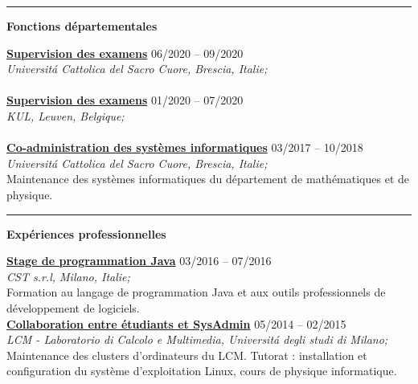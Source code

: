 \documentclass[a4paper]{article}
\newcommand{\block}[1]{\hrule \vspace{0.2cm} \textbf{\Large #1} \vspace{0.2cm}}
\newcommand{\voice}[5]{\href{#4}{\textbf{#1}} \hfill #2 \\ \textit{#3} \\ {\small #5} \vspace{0.2cm} \\}
\begin{document}
    \block{Fonctions départementales}

    
    \voice{Supervision des examens}
        {06/2020 -- 09/2020}
        {Universit\'a Cattolica del Sacro Cuore, Brescia, Italie;}
        {}       
        {\vspace{-0.5cm}}
    \voice{Supervision des examens}
        {01/2020 -- 07/2020}
        {KUL, Leuven, Belgique;}
        {}       
        {\vspace{-0.5cm}}
    \voice{Co-administration des systèmes informatiques}
        {03/2017 -- 10/2018}
        {Universit\'a Cattolica del Sacro Cuore, Brescia, Italie;}
        {https://dipartimenti.unicatt.it/dmf-home}       
        {Maintenance des systèmes informatiques du département de mathématiques et de physique.}

        




    \block{Expériences professionnelles}

    
    \voice{Stage de programmation Java}
        {03/2016  -- 07/2016}
        {CST s.r.l, Milano, Italie;}
        {https://www.csttech.it/}       
        {Formation au langage de programmation Java et aux outils professionnels de développement de logiciels.}
    \voice{Collaboration entre étudiants et SysAdmin}
        {05/2014 -- 02/2015}
        {LCM - Laboratorio di Calcolo e Multimedia, Universit\'a degli studi di Milano;}
        {https://lcm.mi.infn.it/}       
        {Maintenance des clusters d'ordinateurs du LCM. Tutorat : installation et configuration du système d'exploitation Linux, cours de physique informatique.\vspace{-0.5cm}}

        
\end{document}
